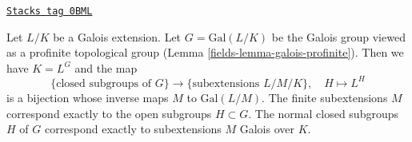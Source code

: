 \begin{theorem}

\label{fields-theorem-inifinite-galois-theory}
\href{https://stacks.math.columbia.edu/tag/0BML}{\texttt{Stacks tag 0BML}}

Let $L/K$ be a Galois extension. Let $G = \text{Gal}(L/K)$
be the Galois group viewed as a profinite topological group
(Lemma \ref{fields-lemma-galois-profinite}). Then we have $K = L^G$ and the map
$$
\{\text{closed subgroups of }G\}
\longrightarrow
\{\text{subextensions }L/M/K\},\quad
H \longmapsto L^H
$$
is a bijection whose inverse maps $M$ to $\text{Gal}(L/M)$.
The finite subextensions $M$ correspond exactly to the open
subgroups $H \subset G$. The normal closed subgroups $H$ of $G$
correspond exactly to subextensions $M$ Galois over $K$.
\end{theorem}

